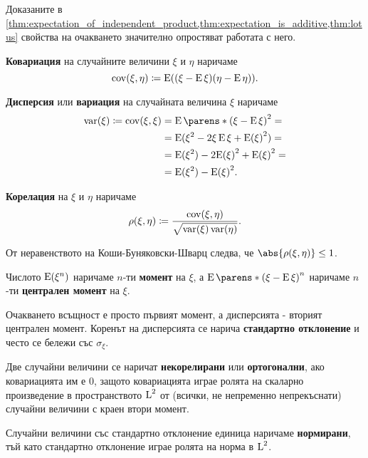 \documentclass{../../common/topic}
\begin{document}
Доказаните в \cref{thm:expectation_of_independent_product,thm:expectation_is_additive,thm:lotus} свойства на очакването значително опростяват работата с него.

\begin{definition}
  \textbf{Ковариация} на случайните величини \( \xi \) и \( \eta \) наричаме
  \begin{equation*}
    \operatorname{cov}(\xi, \eta)
    \coloneqq
    \operatorname{E}((\xi - \operatorname{E} \xi) (\eta - \operatorname{E} \eta)).
  \end{equation*}

  \textbf{Дисперсия} или \textbf{вариация} на случайната величина \( \xi \) наричаме
  \begin{align*}
    \var(\xi)
    \coloneqq
    \cov(\xi, \xi)
    &=
    \Expect \parens*{{(\xi - \Expect \xi)}^2 }
    = \\ &=
    \Expect(\xi^2 - 2 \xi \Expect \xi + {\Expect(\xi)}^2)
    = \\ &=
    \Expect(\xi^2) - 2 {\Expect(\xi)}^2 + {\Expect(\xi)}^2
    = \\ &=
    \Expect(\xi^2) - {\Expect(\xi)}^2.
  \end{align*}

  \textbf{Корелация} на \( \xi \) и \( \eta \) наричаме
  \begin{equation*}
    \operatorname{\rho}(\xi, \eta)
    \coloneqq
    \frac {\operatorname{cov}(\xi, \eta)} {\sqrt{\operatorname{var}(\xi) \operatorname{var}(\eta)}}.
  \end{equation*}

  От неравенството на Коши-Буняковски-Шварц следва, че \( \abs{\corr(\xi, \eta)} \leq 1 \).

  Числото \( \operatorname{E}(\xi^n) \) наричаме \( n \)-ти \textbf{момент} на \( \xi \), а \( \Expect \parens*{ {(\xi - \Expect \xi)}^n } \) наричаме \( n \)-ти \textbf{централен момент} на \( \xi \).

  Очакването всъщност е просто първият момент, а дисперсията - вторият централен момент. Коренът на дисперсията се нарича \textbf{стандартно отклонение} и често се бележи със \( \sigma_\xi \).

  Две случайни величини се наричат \textbf{некорелирани} или \textbf{ортогонални}, ако ковариацията им е \( 0 \), защото ковариацията играе ролята на скаларно произведение в пространството \( \operatorname{L}^2 \) от (всички, не непременно непрекъснати) случайни величини с краен втори момент.

  Случайни величини със стандартно отклонение единица наричаме \textbf{нормирани}, тъй като стандартно отклонение играе ролята на норма в \( \operatorname{L}^2 \).
\end{definition}
\end{document}
